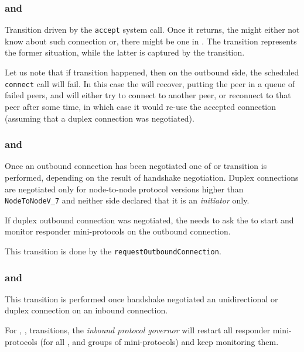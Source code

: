 \subsubsection{\Accepted{} and \Overwritten{}}
Transition driven by the \texttt{accept} system call. Once it returns, the
\connmngr{} might either not know about such connection or, there might be one
in \ReservedOutboundState{}. The \Accepted{} transition represents the former
situation, while the latter is captured by the \Overwritten{} transition.

Let us note that if \Overwritten{} transition happened, then on the outbound
side, the scheduled \texttt{connect} call will fail. In this case the
\ptopgov{} will recover, putting the peer in a queue of failed peers, and
will either try to connect to another peer, or reconnect to that peer after some
time, in which case it would re-use the accepted connection (assuming that
a duplex connection was negotiated).

\subsubsection{\NegotiatedUniOut{} and \NegotiatedDupOut{}}
Once an outbound connection has been negotiated one of \NegotiatedUniOut{} or
\NegotiatedDupOut{} transition is performed, depending on the result of handshake
negotiation. Duplex connections are negotiated only for node-to-node protocol
versions higher than \texttt{NodeToNodeV\_7} and neither side declared that it is an \emph{initiator} only.

If duplex outbound connection was negotiated, the \connmngr{} needs to ask the
\inbgov{} to start and monitor responder mini-protocols on the outbound
connection.

\begin{detail}
This transition is done by the \texttt{requestOutboundConnection}.
\end{detail}


\subsubsection{\NegotiatedUniIn{} and \NegotiatedDupIn{}}
This transition is performed once handshake negotiated an unidirectional or
duplex connection on an inbound connection.

For \NegotiatedUniIn{}, \NegotiatedDupIn{}, \NegotiatedDupOut{}
transitions, the \textit{inbound protocol governor} will restart all responder
mini-protocols (for all \established{}, \warm{} and \hot{} groups of
mini-protocols) and keep monitoring them.

